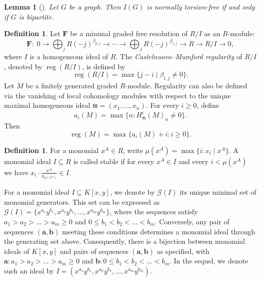 \documentclass[11pt,reqno,a4paper]{amsart}
\newtheorem{lemma}[theorem]{Lemma}
\theoremstyle{definition}
\newtheorem{definition}[theorem]{Definition}
\begin{document}
\begin{lemma}[{\cite[Theorem 5.9]{SimisVasconcelosVillarreal94}}]
\label{lem:normal-torsion-free-bipartite}
Let \(G\) be a graph. Then \(I(G)\) is normally torsion-free if and only if \(G\) is bipartite.
\end{lemma}

\begin{definition}\label{def:reg-pd-depth}
Let $\mathbf{F}$ be a minimal graded free resolution of $R / I$ as an $R$-module:
\[
\mathbf{F}:\;0\to \bigoplus_{j}R(-j)^{\beta_{p,j}}\to \cdots \to \bigoplus_{j}R(-j)^{\beta_{1,j}}\to R\to R/I\to 0,
\]
where $I$ is a homogeneous ideal of $R$.
 The \emph{Castelnuovo--Mumford regularity} of $R/I$, denoted by $\operatorname{reg}(R/I)$, is defined by
    \[
    \operatorname{reg}(R/I)=\max\{j-i\mid \beta_{i,j}\neq 0\}.
    \]
Let $M$ be a finitely generated graded $R$-module. Regularity can also be defined via the vanishing of local cohomology modules with respect to the unique maximal homogeneous ideal
\(
\mathfrak{m} = (x_1,\ldots,x_n).
\)
For every $i\geq 0$, define
\[
a_i(M)
=
\max\{n:H_{\mathfrak{m}}^i(M)_n\neq 0\}.
\]
Then
\[
\operatorname{reg}(M)
=
\max\{a_i(M)+i:i\geq 0\}.
\]



\end{definition}


\begin{definition}

 For a monomial \( x^{A} \in R \), write \( \mu(x^{A}) = \max\{ i : x_i \mid x^{A} \} \). A monomial ideal \( I \subseteq R \) is called stable if for every \( x^{A} \in I \) and every \( i < \mu(x^{A}) \) we have \( x_i \cdot \frac{x^{A}}{x_{\mu(x^{A})}} \in I \). 

    
\end{definition}




 For a monomial ideal \(I \subseteq K[x,y]\), we denote by \(\mathcal{G}(I)\) its unique minimal set of monomial generators. This set can be expressed as \(\mathcal{G}(I) = \{x^{a_{1}}y^{b_{1}}, x^{a_{2}}y^{b_{2}}, \dots, x^{a_{m}}y^{b_{m}}\}\), where the sequences satisfy \(a_{1} > a_{2} > \dots > a_{m} \ge 0\) and \(0 \le b_{1} < b_{2} < \dots < b_{m}\). Conversely, any pair of sequences \((\mathbf{a}, \mathbf{b})\) meeting these conditions determines a monomial ideal through the generating set above. Consequently, there is a bijection between monomial ideals of \(K[x, y]\) and pairs of sequences \((\mathbf{a}, \mathbf{b})\) as specified, with \(\mathbf{a} : a_{1} > a_{2} > \dots > a_{m} \ge 0\) and \(\mathbf{b} : 0 \le b_{1} < b_{2} < \dots < b_{m}\). In the sequel, we denote such an ideal by \(I = (x^{a_{1}}y^{b_{1}}, x^{a_{2}}y^{b_{2}}, \dots, x^{a_{m}}y^{b_{m}})\).
\end{document}
